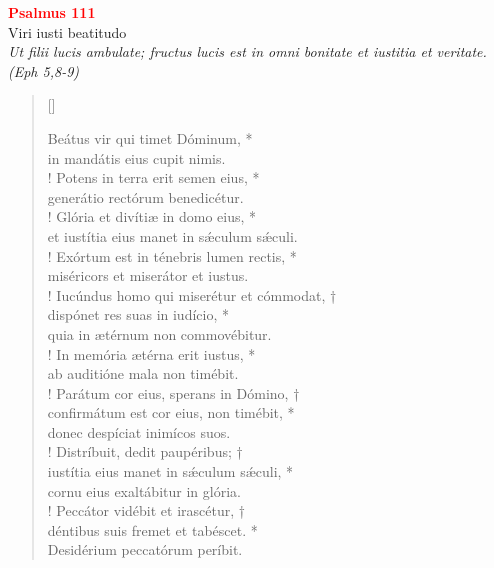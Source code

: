 
\def\greinitialformat#1{%
{\fontsize{39}{39}\selectfont #1}%
}




\vspace{0.3cm}
\begin{center}
 \textcolor{red}{\large \bf Psalmus 111}\\
Viri iusti beatitudo\\
\textit{\small Ut filii lucis ambulate; fructus lucis est in omni bonitate et iustitia et veritate. (Eph 5,8-9)}
\end{center}
\begin{verse}[\versewidth]

Beátus vir qui timet Dóminum, *\\
in mandátis eius cupit nimis.\\!
\vin  Potens in terra erit semen eius, *\\
\vin  generátio rectórum benedicétur.\\!
Glória et divítiæ in domo eius, *\\
et iustítia eius manet in s\'{æ}culum s\'{æ}culi.\\!
\vin  Exórtum est in ténebris lumen rectis, *\\
\vin  miséricors et miserátor et iustus.\\!
Iucúndus homo qui miserétur et cómmodat, †\\
dispónet res suas in iudício, *\\
quia in ætérnum non commovébitur.\\!
\vin  In memória ætérna erit iustus, *\\
\vin  ab auditióne mala non timébit.\\!
Parátum cor eius, sperans in Dómino, †\\
confirmátum est cor eius, non timébit, *\\ 
donec despíciat inimícos suos.\\!
\vin  Distríbuit, dedit paupéribus; †\\
\vin  iustítia eius manet in s\'{æ}culum s\'{æ}culi, *\\
\vin  cornu eius exaltábitur in glória.\\!
Peccátor vidébit et irascétur, †\\
déntibus suis fremet et tabéscet. *\\
Desidérium peccatórum períbit.\\
\end{verse}
\vspace{1cm}

